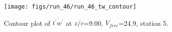 \begin{figure}[H]
\centering
\texttt{[image: figs/run\_46/run\_46\_tw\_contour]}
\caption{Contour plot of $\overline{t^\prime w^\prime}$ at $z/c$=9.00, $V_{free}$=24.9, station 5.}
\end{figure}


